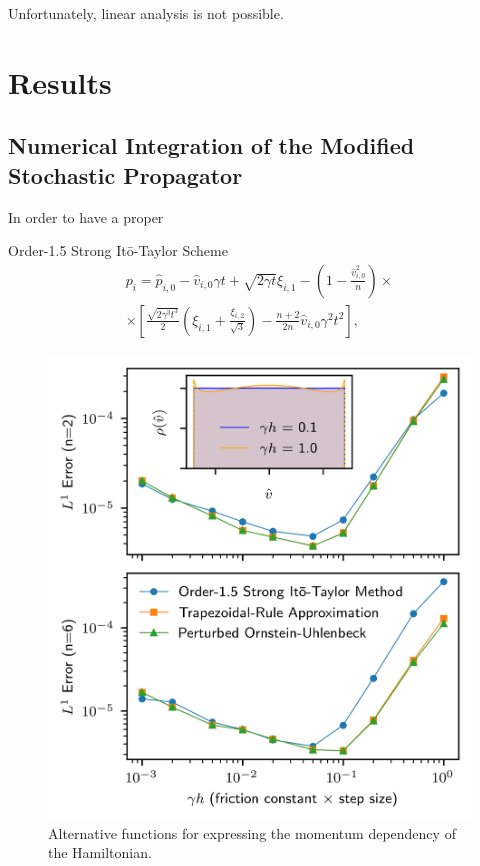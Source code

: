 \documentclass[
aip,
jcp,
reprint,
]{revtex4-1}
\newcommand{\nn}{n}
\begin{document}
Unfortunately, linear analysis is not possible.

\section{Results}
\label{sec:results}

\subsection{Numerical Integration of the Modified Stochastic Propagator}

In order to have a proper 

Order-1.5 Strong It\={o}-Taylor Scheme \cite{Kloeden_1992}
\begin{multline}
p_i = \hat{p}_{i,0} - \hat{v}_{i,0} \gamma t + \sqrt{2 \gamma t} \xi_{i,1} - \left(1 - \frac{\hat{v}_{i,0}^2}{\nn}\right) \times \\
\times \left[ \frac{\sqrt{2 \gamma^3 t^3}}{2}\left(\xi_{i,1} + \frac{\xi_{i,2}}{\sqrt{3}}\right) - \frac{\nn+2}{2 \nn} \hat{v}_{i,0} \gamma^2 t^2 \right],
\end{multline}

\begin{figure}
	\centering
	\includegraphics{stochastic_integration}
	\caption{Alternative functions for expressing the momentum dependency of the Hamiltonian.}
	\label{fig:stochastic integration}
\end{figure}
\end{document}
